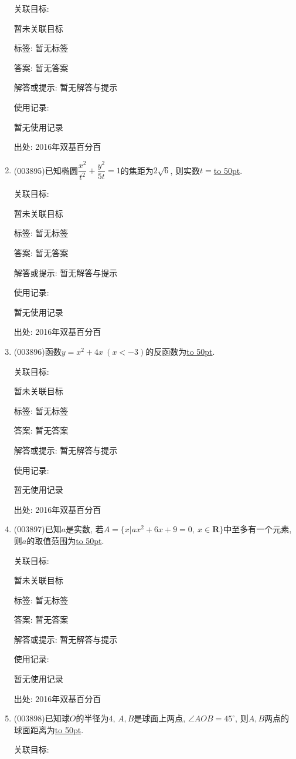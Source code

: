 \documentclass[10pt,a4paper]{article}
\newcommand{\blank}[1]{\underline{\hbox to #1pt{}}}
\begin{document}
\begin{enumerate}[1.]
关联目标:

暂未关联目标



标签: 暂无标签

答案: 暂无答案

解答或提示: 暂无解答与提示

使用记录:

暂无使用记录


出处: 2016年双基百分百
\item { (003895)}已知椭圆$\dfrac{x^2}{t^2}+\dfrac{y^2}{5t}=1$的焦距为$2\sqrt{6}$, 则实数$t=$\blank{50}.


关联目标:

暂未关联目标



标签: 暂无标签

答案: 暂无答案

解答或提示: 暂无解答与提示

使用记录:

暂无使用记录


出处: 2016年双基百分百
\item { (003896)}函数$y=x^2+4x \ (x<-3)$的反函数为\blank{50}.


关联目标:

暂未关联目标



标签: 暂无标签

答案: 暂无答案

解答或提示: 暂无解答与提示

使用记录:

暂无使用记录


出处: 2016年双基百分百
\item { (003897)}已知$a$是实数, 若$A=\{x|ax^2+6x+9=0, \ x\in \mathbf{R}\}$中至多有一个元素, 则$a$的取值范围为\blank{50}.


关联目标:

暂未关联目标



标签: 暂无标签

答案: 暂无答案

解答或提示: 暂无解答与提示

使用记录:

暂无使用记录


出处: 2016年双基百分百
\item { (003898)}已知球$O$的半径为$4$, $A,B$是球面上两点, $\angle AOB=45^\circ$, 则$A,B$两点的球面距离为\blank{50}.


关联目标:


\end{enumerate}
\end{document}
